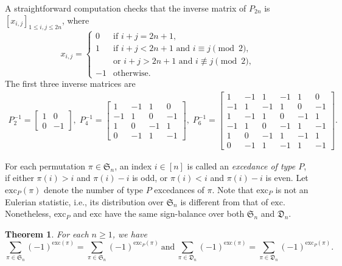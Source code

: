 \documentclass[11pt,reqno]{amsart}
\numberwithin{equation}{section}
\theoremstyle{plain}
\newtheorem{theorem}{Theorem}[section]
\theoremstyle{definition}
\renewcommand{\S}{\mathfrak{S}}
\def\exc{\mathrm{exc}}
\newcommand{\D}{\mathfrak{D}}
\def\t{\text}
\begin{document}
A straightforward computation checks that the inverse matrix of $P_{2n}$ is $[x_{i,j}]_{1\le i,j \le 2n}$, where
$$x_{i,j}=\begin{cases}
0 & \text{if $i+j=2n+1$},\\
1 & \text{if $i+j<2n+1$ and $i\equiv j \pmod 2$,}\\
& \text{or $i+j>2n+1$ and $i\not\equiv j \pmod 2$},\\
-1 & \text{otherwise}.
\end{cases}$$
 The first three inverse matrices are
\begin{align*}
P^{-1}_2=\begin{bmatrix}
1 & 0 \\
0 & -1
\end{bmatrix},
\;
P^{-1}_4=\begin{bmatrix}
1 & -1 & 1 & 0\\
-1 & 1 & 0 & -1\\
1 & 0 & -1 & 1\\
0 & -1 & 1 & -1
\end{bmatrix},
\;
P^{-1}_6=\begin{bmatrix}
1 & -1 & 1 & -1 & 1 & 0\\
-1 & 1 & -1 & 1 & 0 & -1\\
1 & -1 & 1 & 0 & -1 & 1\\
-1 & 1 & 0 & -1 & 1 & -1\\
1 & 0 & -1 & 1 & -1 & 1\\
0 & -1 & 1 & -1 & 1 & -1
\end{bmatrix}.
\end{align*}

For each permutation $\pi\in\S_n$, an index $i\in [n]$ is called an {\it excedance of type $P$}, if either $\pi(i)>i$ and $\pi(i)-i$ is odd, or $\pi(i)<i$ and $\pi(i)-i$ is even. Let $\exc_P(\pi)$ denote the number of type $P$ excedances of $\pi$. Note that $\exc_P$ is not an Eulerian statistic, i.e., its distribution over $\S_n$ is different from that of $\exc$. Nonetheless, $\exc_P$ and $\exc$ have the same sign-balance over both $\S_n$ and $\D_n$.

\begin{theorem}
For each $n\ge 1$, we have
\begin{equation}\label{id:exc=excP over der}

\sum_{\pi\in\S_n}(-1)^{\exc(\pi)} = \sum_{\pi\in\S_n}(-1)^{\exc_P(\pi)}
\ \t{and}\ \sum_{\pi\in\D_n}(-1)^{\exc(\pi)} = \sum_{\pi\in\D_n}(-1)^{\exc_P(\pi)}.
\end{equation}
\end{theorem}
\end{document}
